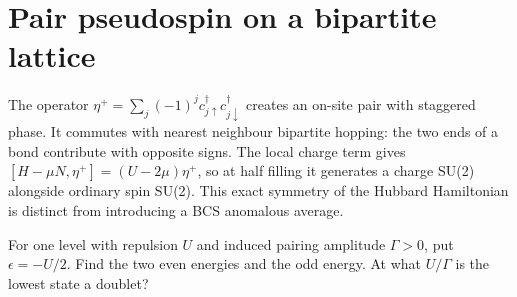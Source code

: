 \section{Pair pseudospin on a bipartite lattice}
The operator $\eta^+=\sum_j(-1)^j c^\dagger_{j\uparrow}c^\dagger_{j\downarrow}$
creates an on-site pair with staggered phase. It commutes with nearest
neighbour bipartite hopping: the two ends of a bond contribute with
opposite signs. The local charge term gives
$[H-\mu N,\eta^+]=(U-2\mu)\eta^+$, so at half filling it generates a
charge SU(2) alongside ordinary spin SU(2). This exact symmetry of the
Hubbard Hamiltonian is distinct from introducing a BCS anomalous
average.
\begin{exercise}\label{ex:andreev}
For one level with repulsion $U$ and induced pairing amplitude
$\Gamma>0$, put $\epsilon=-U/2$. Find the two even energies and the
odd energy. At what $U/\Gamma$ is the lowest state a doublet?
\end{exercise}
